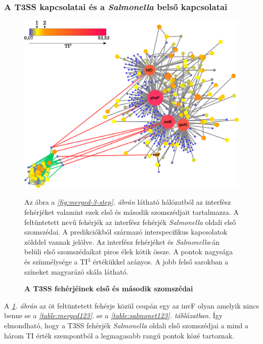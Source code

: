 \documentclass[a4paper,12pt]{article}
\newenvironment{imgdesc}{
		\small
		\singlespacing
		\begin{center}

	}{
		\end{center}
	}
\begin{document}
		\subsubsection{A T3SS kapcsolatai és a \textit{Salmonella} belső kapcsolatai}

		\begin{figure}[H]
			\includegraphics[scale=0.6]{img/t3ss-inner-salmonella.pdf}
			\centering
			\caption{ \textbf{A T3SS fehérjéinek első és második szomszédai}}
			\begin{imgdesc}
				Az ábra a \textit{\ref{fig:merged-3-step}. ábrán} látható hálózatból az interfész fehérjéket valamint ezek első és második szomszédjait tartalmazza. A feltüntetett nevű fehérjék az interfész fehérjék \textit{Salmonella} oldali első szomszédai. A predikciókból származó interspecifikus kapcsolatok zölddel vannak jelölve. Az interfész fehérjéket és \textit{Salmonella}-án belüli első szomszédaikat piros élek kötik össze. A pontok nagysága és színmélysége a TI$^3$ értékükkel arányos. A jobb felső sarokban a színeket magyarázó skála látható.
			\end{imgdesc}
			\label{fig:t3ss_inner}
		\end{figure}

		A \textit{\ref{fig:t3ss_inner}. ábrán} az öt feltüntetett fehérje közül csupán egy az invF olyan amelyik nincs benne se a \textit{\ref{table:merged123}.} se a \textit{\ref{table:salmonet123}. táblázatban}. Így elmondható, hogy a T3SS fehérjék \textit{Salmonella} oldali első szomszédjai a mind a három TI érték szempontból a legmagasabb rangú pontok közé tartoznak.
\end{document}
